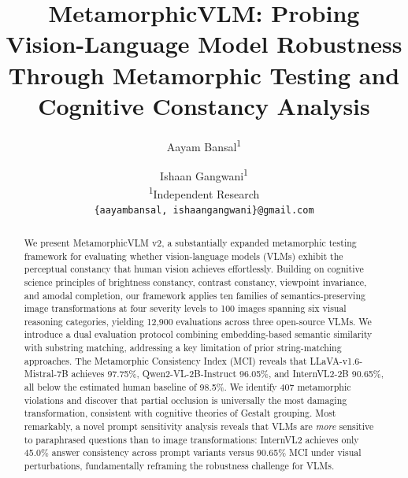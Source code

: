 \documentclass{cvpr}
\begin{document}
\title{MetamorphicVLM: Probing Vision-Language Model Robustness\\Through Metamorphic Testing and Cognitive Constancy Analysis}

\author{Aayam Bansal\textsuperscript{1} \and Ishaan Gangwani\textsuperscript{1}\\
\textsuperscript{1}Independent Research\\
{\tt\small \{aayambansal, ishaangangwani\}@gmail.com}}

\maketitle

\begin{abstract}
We present MetamorphicVLM v2, a substantially expanded metamorphic testing framework for evaluating whether vision-language models (VLMs) exhibit the perceptual constancy that human vision achieves effortlessly. Building on cognitive science principles of brightness constancy, contrast constancy, viewpoint invariance, and amodal completion, our framework applies ten families of semantics-preserving image transformations at four severity levels to 100 images spanning six visual reasoning categories, yielding 12{,}900 evaluations across three open-source VLMs. We introduce a dual evaluation protocol combining embedding-based semantic similarity with substring matching, addressing a key limitation of prior string-matching approaches. The Metamorphic Consistency Index (MCI) reveals that LLaVA-v1.6-Mistral-7B achieves 97.75\%, Qwen2-VL-2B-Instruct 96.05\%, and InternVL2-2B 90.65\%, all below the estimated human baseline of 98.5\%. We identify 407 metamorphic violations and discover that partial occlusion is universally the most damaging transformation, consistent with cognitive theories of Gestalt grouping. Most remarkably, a novel prompt sensitivity analysis reveals that VLMs are \textit{more} sensitive to paraphrased questions than to image transformations: InternVL2 achieves only 45.0\% answer consistency across prompt variants versus 90.65\% MCI under visual perturbations, fundamentally reframing the robustness challenge for VLMs.
\end{abstract}

\end{document}
